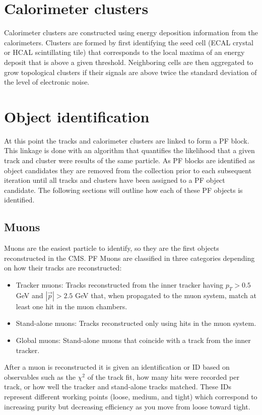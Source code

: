 \section{Calorimeter clusters}
Calorimeter clusters are constructed using energy deposition information from the calorimeters.  Clusters are formed by first identifying the seed cell (ECAL crystal or HCAL scintillating tile) that corresponds to the local maxima of an energy deposit that is above a given threshold.  Neighboring cells are then aggregated to grow topological clusters if their signals are above twice the standard deviation of the level of electronic noise.  

\section{Object identification}
At this point the tracks and calorimeter clusters are linked to form a PF block.  This linkage is done with an algorithm that quantifies the likelihood that a given track and cluster were results of the same particle.  As PF blocks are identified as object candidates they are removed from the collection prior to each subsequent iteration until all tracks and clusters have been assigned to a PF object candidate.  The following sections will outline how each of these PF objects is identified.
\subsection{Muons}
Muons are the easiest particle to identify, so they are the first objects reconstructed in the CMS.  PF Muons are classified in three categories depending on how their tracks are reconstructed:
\begin{itemize}
	\item Tracker muons:  Tracks reconstructed from the inner tracker having $p_T>0.5$ GeV and $|\vec{p}|>2.5$ GeV that, when propagated to the muon system, match at least one hit in the muon chambers.
	\item Stand-alone muons:  Tracks reconstructed only using hits in the muon system.
	\item Global muons:  Stand-alone muons that coincide with a track from the inner tracker.
\end{itemize}
After a muon is reconstructed it is given an identification or ID based on observables such as the $\chi^2$ of the track fit, how many hits were recorded per track, or how well the tracker and stand-alone tracks matched.  These IDs represent different working points (loose, medium, and tight) which correspond to increasing purity but decreasing efficiency as you move from loose toward tight.  
